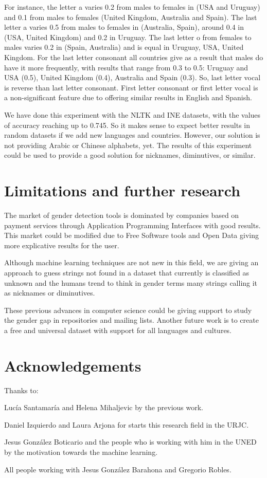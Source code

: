 \documentclass[a4paper]{article}
\begin{document}
For instance, the letter a varies 0.2 from males to females in (USA and Uruguay) and 0.1 from males to females (United Kingdom, Australia and Spain).
The last letter a varies 0.5 from males to females in (Australia, Spain), around 0.4 in (USA, United Kingdom) and 0.2 in
Uruguay.
The last letter o from females to males varies 0.2 in (Spain, Australia) and is equal in Uruguay, USA, United Kingdom.
For the last letter consonant all countries give as a result that males do have it more frequently, with results that range from 0.3 to 0.5: Uruguay and USA (0.5), United Kingdom (0.4), Australia and Spain (0.3). 
So, last letter vocal is reverse than last letter consonant. 
First letter consonant or first letter vocal is a non-significant feature due to offering similar results in English and Spanish.

We have done this experiment with the NLTK and INE datasets, with the values of accuracy reaching up to 0.745.
So it makes sense to expect better results in random datasets if we add new languages and countries.
However, our solution is not providing Arabic or Chinese alphabets, yet.
The results of this experiment could be used to provide a good solution for nicknames, diminutives, or similar.


\section{Limitations and further research}


The market of gender detection tools is dominated by companies based on payment services through Application Programming Interfaces with good results. 
This market could be modified due to Free Software tools and Open Data giving more explicative results for the user.

Although machine learning techniques are not new in this field, we are giving an approach to guess strings not found in a dataset that currently is classified as unknown and the humans trend to think in gender terms many strings calling it as nicknames or diminutives.

These previous advances in computer science could be giving support to study the gender gap in repositories and mailing lists.
Another future work is to create a free and universal dataset with support for all languages and cultures.


\section*{Acknowledgements}

Thanks to:

Lucía Santamaría and Helena Mihaljevic by the previous work.

Daniel Izquierdo and Laura Arjona for starts this research field in the URJC.

Jesus González Boticario and the people who is working with him in the UNED by the motivation towards the machine learning.

All people working with Jesus González Barahona and Gregorio Robles.

 

\end{document}
